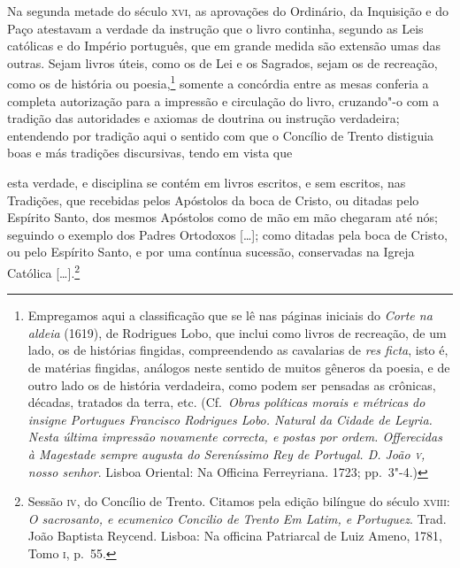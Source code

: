 Na segunda metade do século \textsc{xvi}, as aprovações do Ordinário, da
Inquisição e do Paço atestavam a verdade da instrução que o livro
continha, segundo as Leis católicas e do Império português, que em
grande medida são extensão umas das outras. Sejam livros úteis, como os
de Lei e os Sagrados, sejam os de recreação, como os de história ou
poesia,\footnote{ Empregamos aqui a classificação que se lê nas páginas
iniciais do \textit{Corte na aldeia} (1619), de Rodrigues Lobo, que inclui como
livros de recreação, de um lado, os de histórias fingidas, compreendendo
as cavalarias de \textit{res ficta}, isto é, de matérias fingidas, análogos neste
sentido de muitos gêneros da poesia, e de outro lado os de história
verdadeira, como podem ser pensadas as crônicas, décadas, tratados da
terra, etc. (Cf.~\textit{Obras políticas morais e métricas do insigne Portugues
Francisco Rodrigues Lobo. Natural da Cidade de Leyria. Nesta última
impressão novamente correcta, e postas por ordem. Offerecidas à
Magestade sempre augusta do Sereníssimo Rey de Portugal. D. João \textsc{v},
nosso senhor}. Lisboa Oriental: Na Officina Ferreyriana. 1723;
pp.~3"-4.)} somente a concórdia entre as mesas conferia a completa
autorização para a impressão e circulação do livro, cruzando"-o com a
tradição das autoridades e axiomas de doutrina ou instrução verdadeira;
entendendo por tradição aqui o sentido com que o Concílio de Trento
distiguia boas e más tradições discursivas, tendo em vista que 

\begin{hedraquote}
esta verdade, e disciplina se contém em livros escritos, e sem escritos,
nas Tradições, que recebidas pelos Apóstolos da boca de Cristo, ou
ditadas pelo Espírito Santo, dos mesmos Apóstolos como de mão em mão
chegaram até nós; seguindo o exemplo dos Padres Ortodoxos [\ldots{}]; como
ditadas pela boca de Cristo, ou pelo Espírito Santo, e por uma
contínua sucessão, conservadas na Igreja Católica [\ldots{}].\footnote{ Sessão 
\textsc{iv}, do Concílio de Trento. Citamos pela edição bilíngue do
século 	\textsc{xviii}: \textit{O sacrosanto, e ecumenico Concilio de Trento Em Latim, e
Portuguez}. Trad. João Baptista Reycend. Lisboa: Na officina Patriarcal
de Luiz Ameno, 1781, Tomo \textsc{i}, p.~55.}
\end{hedraquote}

